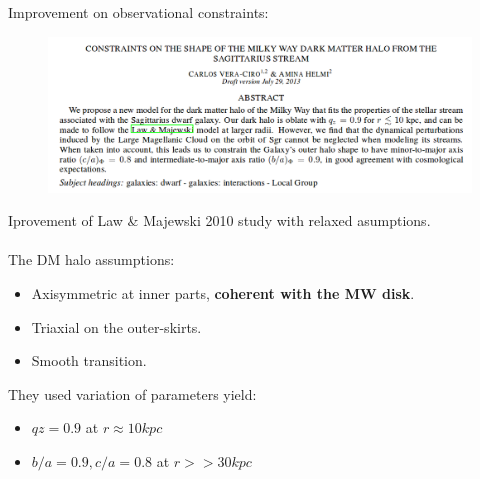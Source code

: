 \documentclass[xcolor=dvipsnames]{beamer}
\begin{document}
\begin{frame}

Improvement on observational constraints:

\begin{figure}[c]
\includegraphics[width=1\linewidth]{./pics/veraCiroSagitarius.png}
\end{figure}

\end{frame}


\begin{frame}

Iprovement of Law \& Majewski 2010 study with relaxed asumptions.\\~\\

The DM halo assumptions:

\begin{itemize}
\item Axisymmetric at inner parts, \textbf{coherent with the MW disk}.

\item Triaxial on the outer-skirts.

\item Smooth transition.

\end{itemize}

They used variation of parameters yield:

\begin{itemize}
\item $qz = 0.9$ at $r \approx 10kpc$

\item $b/a = 0.9, c/a = 0.8$ at $r>>30kpc$

\end{itemize}

\end{frame}
\end{document}
